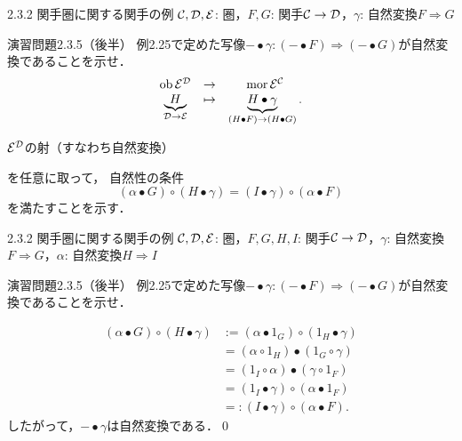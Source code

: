 \documentclass[uplatex,a4paper,dvipdfmx,aspectratio=169,10pt]{beamer}
\begin{document}
\begin{frame}[fragile]{2.3.2 関手圏に関する関手の例}
    $\mathcal{C}, \mathcal{D}, \mathcal{E}$: 圏，$F, G$: 関手$\mathcal{C} \to \mathcal{D}$，$\gamma$: 自然変換$F \Rightarrow G$
    \begin{exampleblock}{演習問題2.3.5（後半）}
        例2.25で定めた写像$- \bullet \gamma \colon (- \bullet F) \Rightarrow (- \bullet G)$が自然変換であることを示せ．
                \begin{equation*}
                    \begin{array}{ccc}
                        \operatorname{{\mathrm{ob}}} \mathcal{E}^{\mathcal{D}} & \to & \operatorname{{\mathrm{mor}}} \mathcal{E}^{\mathcal{C}}  \\
                        \underbrace{H}_{\mathcal{D} \to \mathcal{E}} & \mapsto & \underbrace{H \bullet \gamma}_{(H \bullet F) \to (H \bullet G)}.
                    \end{array}
                \end{equation*}
    \end{exampleblock}

    $\mathcal{E}^{\mathcal{D}}$の射（すなわち自然変換） を任意に取って，
    自然性の条件
    \begin{equation*}
        (\alpha \bullet G) \circ (H \bullet \gamma) = (I \bullet \gamma) \circ (\alpha \bullet F)
    \end{equation*}
    を満たすことを示す．
\end{frame}

\begin{frame}[fragile]{2.3.2 関手圏に関する関手の例}
    $\mathcal{C}, \mathcal{D}, \mathcal{E}$: 圏，$F, G, H, I$: 関手$\mathcal{C} \to \mathcal{D}$，$\gamma$: 自然変換$F \Rightarrow G$，$\alpha$: 自然変換$H \Rightarrow I$
    \begin{exampleblock}{演習問題2.3.5（後半）}
        例2.25で定めた写像$- \bullet \gamma \colon (- \bullet F) \Rightarrow (- \bullet G)$が自然変換であることを示せ．
    \end{exampleblock}
    \begin{align*}
        (\alpha \bullet G) \circ (H \bullet \gamma) &:= (\alpha \bullet 1_G) \circ (1_H \bullet \gamma) \\
                                                     &= (\alpha \circ 1_H) \bullet (1_G \circ \gamma) \tag{$\because$命題2.9} \\
                                                     &= (1_I \circ \alpha) \bullet (\gamma \circ 1_F) \\
                                                     &= (1_I \bullet \gamma) \circ (\alpha \bullet 1_F) \tag{$\because$命題2.9} \\
                                                     &=: (I \bullet \gamma) \circ (\alpha \bullet F).
    \end{align*}
    したがって，$- \bullet \gamma$は自然変換である．\qed
\end{frame}
\end{document}
